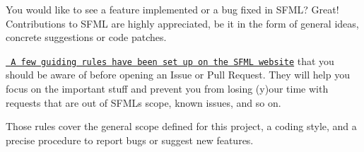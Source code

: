 You would like to see a feature implemented or a bug fixed in S\+F\+ML? Great! Contributions to S\+F\+ML are highly appreciated, be it in the form of general ideas, concrete suggestions or code patches.

\href{https://www.sfml-dev.org/contribute.php}{\texttt{ A few guiding rules have been set up on the S\+F\+ML website}} that you should be aware of before opening an Issue or Pull Request. They will help you focus on the important stuff and prevent you from losing (y)our time with requests that are out of S\+F\+ML\textquotesingle{}s scope, known issues, and so on.

Those rules cover the general scope defined for this project, a coding style, and a precise procedure to report bugs or suggest new features. 